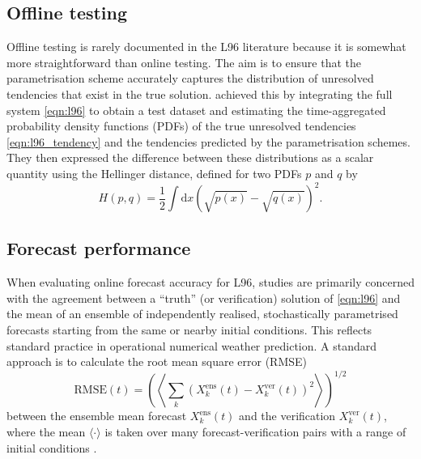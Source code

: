 \documentclass[../main.tex]{subfiles}
\begin{document}
\subsection{Offline testing} \label{sec:l96_offline_testing}
Offline testing is rarely documented in the L96 literature because it is
somewhat more straightforward than online testing. The aim is to ensure that
the parametrisation scheme accurately captures the distribution of unresolved
tendencies that exist in the true solution. \textcite{gagne2020} achieved this
by integrating the full system \cref{eqn:l96} to obtain a test dataset and
estimating the time-aggregated probability density functions (PDFs) of the true
unresolved tendencies \cref{eqn:l96_tendency} and the tendencies predicted by
the parametrisation schemes. They then expressed the difference between these
distributions as a scalar quantity using the Hellinger distance, defined for
two PDFs $p$ and $q$ by
\begin{equation} \label{eqn:hellinger}
    H(p,q) = \frac{1}{2} \int \mathrm{d}x
        \left( \sqrt{p(x)} - \sqrt{q(x)} \right)^2.
\end{equation}

\subsection{Forecast performance}
When evaluating online forecast accuracy for L96, studies are primarily
concerned with the agreement between a ``truth'' (or verification) solution of
\cref{eqn:l96} and the mean of an ensemble of independently realised,
stochastically parametrised forecasts starting from the same or nearby initial
conditions. This reflects standard practice in operational numerical weather
prediction. A standard approach is to calculate the root mean square error
(RMSE)
\begin{equation*}
    \mathrm{RMSE}(t) = \left( \left\langle
        \sum_k (X_k^\text{ens}(t) - X_k^\text{ver}(t))^2
    \right\rangle \right)^{1/2}
\end{equation*}
between the ensemble mean forecast $X_k^\text{ens}(t)$ and the verification
$X_k^\text{ver}(t)$, where the mean $\langle \cdot \rangle$ is taken over many
forecast-verification pairs with a range of initial conditions
\parencite{crommelin2008,gagne2020}.
\end{document}

